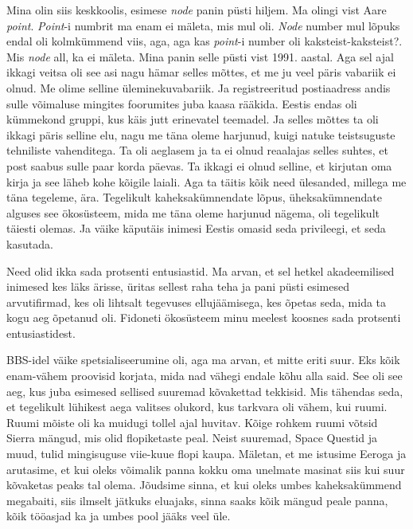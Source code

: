 Mina olin siis keskkoolis, esimese \emph{node} panin püsti hiljem. Ma olingi vist Aare \emph{point}. 
\emph{Point}-i numbrit ma enam ei mäleta, mis mul oli. \emph{Node} number mul 
lõpuks endal oli kolmkümmend viis, aga, aga kas \emph{point}-i number oli 
kaksteist-kaksteist?. Mis \emph{node} all, ka ei mäleta. Mina panin selle 
püsti vist 1991. aastal. Aga sel ajal  
ikkagi veitsa oli see asi nagu hämar selles mõttes, et me ju veel päris 
vabariik ei olnud. Me olime selline üleminekuvabariik. Ja  
registreeritud postiaadress andis sulle  võimaluse mingites  foorumites juba 
kaasa rääkida. Eestis endas oli kümmekond gruppi, kus käis jutt erinevatel 
teemadel. Ja selles mõttes ta oli ikkagi päris selline elu, nagu me täna oleme 
harjunud, kuigi natuke teistsuguste tehniliste vahenditega. Ta oli aeglasem ja 
ta ei olnud reaalajas selles suhtes, et post saabus sulle paar korda 
päevas. Ta ikkagi ei olnud selline, et kirjutan oma kirja ja see läheb kohe 
kõigile laiali. Aga ta täitis kõik need ülesanded, millega me täna tegeleme, 
ära. Tegelikult kaheksakümnendate lõpus, üheksakümnendate alguses see 
ökosüsteem, mida me täna oleme harjunud nägema, oli tegelikult täiesti olemas. 
Ja väike käputäis inimesi Eestis omasid seda privileegi, et seda kasutada. 


Need olid ikka sada protsenti entusiastid. Ma arvan, et sel hetkel akadeemilised inimesed  kes läks ärisse, üritas sellest raha teha ja pani püsti 
esimesed arvutifirmad, kes oli lihtsalt tegevuses  ellujäämisega, kes õpetas 
seda, mida ta kogu aeg õpetanud oli. Fidoneti ökosüsteem minu meelest koosnes sada 
protsenti entusiastidest.


BBS-idel väike spetsialiseerumine oli, aga ma arvan, et mitte eriti suur. Eks 
kõik enam-vähem proovisid korjata, mida nad vähegi endale  kõhu alla said. 
See oli see aeg, kus juba esimesed sellised suuremad kõvakettad tekkisid. 
Mis tähendas seda, et tegelikult lühikest aega valitses olukord, kus tarkvara 
oli vähem, kui ruumi. Ruumi mõiste oli ka muidugi tollel ajal huvitav. Kõige 
rohkem ruumi võtsid Sierra mängud, mis olid flopiketaste peal. Neist suuremad, Space 
Questid ja muud, tulid mingisuguse viie-kuue flopi 
kaupa. Mäletan, et me istusime Eeroga ja arutasime, et 
kui oleks võimalik panna kokku oma unelmate masinat siis kui suur kõvaketas 
peaks tal olema. Jõudsime sinna, et kui oleks umbes kaheksakümmend megabaiti, 
siis ilmselt jätkuks eluajaks, sinna saaks kõik mängud peale panna, kõik 
tööasjad ka ja umbes pool jääks veel üle.

